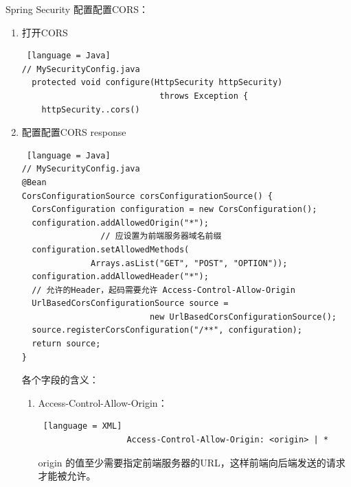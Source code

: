 \begin{enumerate}
          Spring Security 配置配置CORS：
          \begin{enumerate}
              \item 打开CORS \begin{lstlisting} [language = Java]
// MySecurityConfig.java
  protected void configure(HttpSecurity httpSecurity) 
                            throws Exception {
    httpSecurity..cors()
              \end{lstlisting}
              \item 配置配置CORS response
                    \begin{lstlisting} [language = Java]
// MySecurityConfig.java
@Bean
CorsConfigurationSource corsConfigurationSource() {
  CorsConfiguration configuration = new CorsConfiguration();
  configuration.addAllowedOrigin("*"); 
                // 应设置为前端服务器域名前缀
  configuration.setAllowedMethods(
              Arrays.asList("GET", "POST", "OPTION"));
  configuration.addAllowedHeader("*");
  // 允许的Header，起码需要允许 Access-Control-Allow-Origin
  UrlBasedCorsConfigurationSource source = 
                          new UrlBasedCorsConfigurationSource();
  source.registerCorsConfiguration("/**", configuration);
  return source;
}
          \end{lstlisting}
          各个字段的含义：
          \begin{enumerate}
              \item Access-Control-Allow-Origin：\\
              \begin{lstlisting} [language = XML]
                  Access-Control-Allow-Origin: <origin> | *
              \end{lstlisting}
              origin 的值至少需要指定前端服务器的URL，这样前端向后端发送的请求才能被允许。
          \end{enumerate}
          \end{enumerate}
\end{enumerate}